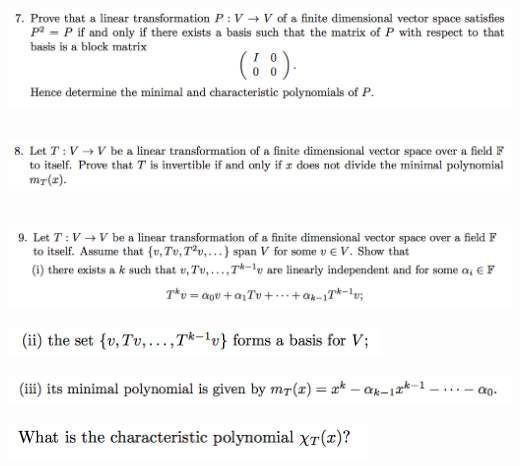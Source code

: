 \documentclass[12pt]{article}
\begin{document}
\subsection*{} %
\begin{mdframed}
\includegraphics[width=400pt]{img/linear-algebra-a0-1-7.png}\\
\end{mdframed}

\subsection*{} %
\begin{mdframed}
\includegraphics[width=400pt]{img/linear-algebra-a0-1-8.png}\\
\end{mdframed}

\subsection*{} %
\begin{mdframed}
\includegraphics[width=400pt]{img/linear-algebra-a0-1-9-a.png}\\
\end{mdframed}
\begin{mdframed}
\includegraphics[width=280pt]{img/linear-algebra-a0-1-9-b.png}\\
\end{mdframed}
\begin{mdframed}
\includegraphics[width=400pt]{img/linear-algebra-a0-1-9-c.png}\\
\end{mdframed}
\begin{mdframed}
\includegraphics[width=270pt]{img/linear-algebra-a0-1-9-d.png}\\
\end{mdframed}
\end{document}
